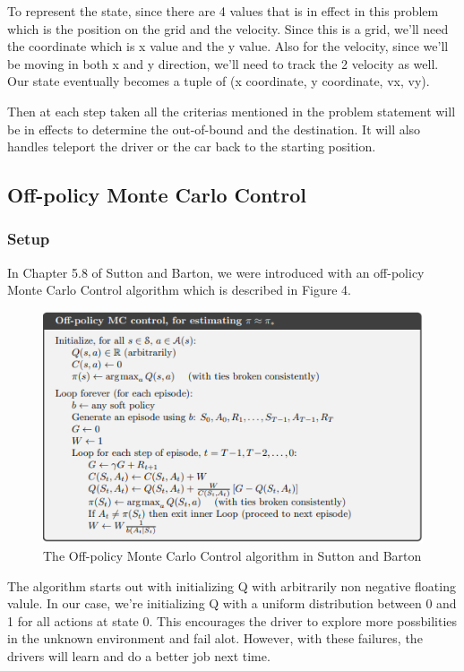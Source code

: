 \documentclass{article}
\begin{document}
To represent the state, since there are 4 values that is in effect in this
problem which is the position on the grid and the velocity. Since this is a
grid, we'll need the coordinate which is x value and the y value. Also for the
velocity, since we'll be moving in both x and y direction, we'll need to track
the 2 velocity as well. Our state eventually becomes a tuple of (x coordinate, y
coordinate, vx, vy).

Then at each step taken all the criterias mentioned in the problem statement
will be in effects to determine the out-of-bound and the destination. It will
also handles teleport the driver or the car back to the starting position.

\subsection{Off-policy Monte Carlo Control}
\subsubsection{Setup}
In Chapter 5.8 of Sutton and Barton, we were introduced with an off-policy Monte
Carlo Control algorithm which is described in Figure 4.

\begin{figure}[h!]
\centering
\includegraphics[scale=0.9]{./images/op-mc-algo.png}
\caption{The Off-policy Monte Carlo Control algorithm in Sutton and Barton}
\label{fig:op-mc-algo}
\end{figure}

The algorithm starts out with initializing Q with arbitrarily non negative
floating valule. In our case, we're initializing Q with a uniform distribution
between 0 and 1 for all actions at state 0. This encourages the driver to
explore more possbilities in the unknown environment and fail alot. However,
with these failures, the drivers will learn and do a better job next time.
\end{document}
